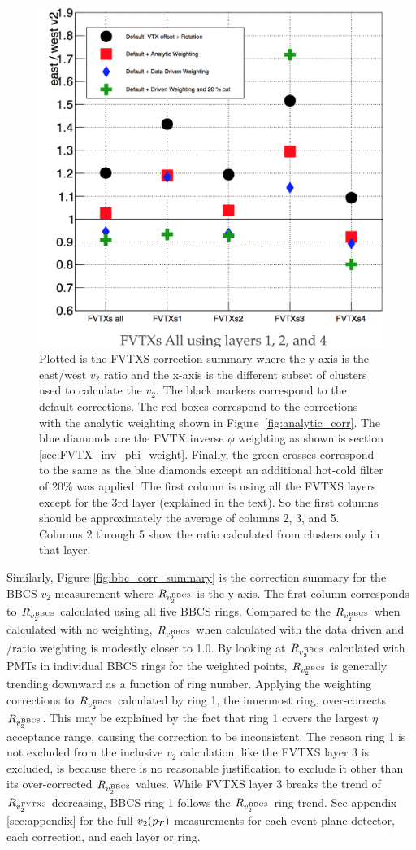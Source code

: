 \begin{figure}[!h]
\begin{center}
\includegraphics[width=0.5\linewidth]{figs/fvtx_correction_summary.png}
\caption{Plotted is the FVTXS correction summary where the y-axis is the east/west $v_2$ ratio and the x-axis is the different subset of clusters used to calculate the $v_2$. The black markers correspond to the default corrections. The red boxes correspond to the corrections with the analytic weighting shown in Figure~\ref{fig:analytic_corr}. The blue diamonds are the FVTX inverse $\phi$ weighting as shown is section \ref{sec:FVTX_inv_phi_weight}. Finally, the green crosses correspond to the same as the blue diamonds except an additional hot-cold filter of 20\% was applied. The first column is using all the FVTXS layers except for the 3rd layer (explained in the text). So the first columns should be approximately the average of columns 2, 3, and 5. Columns 2 through 5 show the ratio calculated from clusters only in that layer.}
\label{fig:fvtx_corr_summary}
\end{center}
\end{figure}

Similarly, Figure \ref{fig:bbc_corr_summary} is the correction summary for the BBCS $v_2$ measurement where $R_{v_2^{\rm BBCS}}$ is the y-axis. The first column corresponds to $R_{v_2^{\rm BBCS}}$ calculated using all five BBCS rings. Compared to the $R_{v_2^{\rm BBCS}}$ when calculated with no weighting, $R_{v_2^{\rm BBCS}}$ when calculated with the data driven and \pp/\pau ratio weighting is modestly closer to 1.0. By looking at $R_{v_2^{\rm BBCS}}$ calculated with PMTs in individual BBCS rings for the weighted points, $R_{v_2^{\rm BBCS}}$ is generally trending downward as a function of ring number. Applying the weighting corrections to $R_{v_2^{\rm BBCS}}$ calculated by ring 1, the innermost ring, over-corrects $R_{v_2^{\rm BBCS}}$. This may be explained by the fact that ring 1 covers the largest $\eta$ acceptance range, causing the correction to be inconsistent. The reason ring 1 is not excluded from the inclusive $v_2$ calculation, like the FVTXS layer 3 is excluded, is because there is no reasonable justification to exclude it other than its over-corrected $R_{v_2^{\rm BBCS}}$ values. While FVTXS layer 3 breaks the trend of $R_{v_2^{\rm FVTXS}}$ decreasing, BBCS ring 1 follows the $R_{v_2^{\rm BBCS}}$ ring trend. See appendix \ref{sec:appendix} for the full $v_2(\mbox{$p_T$})$ measurements for each event plane detector, each correction, and each layer or ring.

